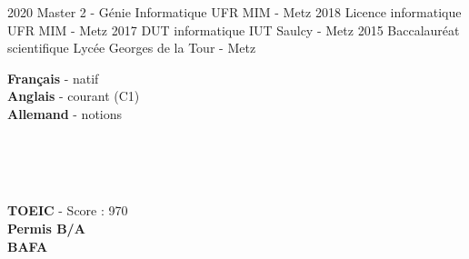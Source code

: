 \documentclass[9pt]{developercv} %
\begin{document}


\begin{entrylist}
	\entry
		{2020}
		{Master 2 - Génie Informatique}
		{UFR MIM - Metz}
		{}
	\entry
		{2018}
		{Licence informatique}
		{UFR MIM - Metz}
		{}
	\entry
		{2017}
		{DUT informatique}
		{IUT Saulcy - Metz}
		{}
	\entry
		{2015}
		{Baccalauréat scientifique}
		{Lycée Georges de la Tour - Metz}
		{}
\end{entrylist}


\begin{minipage}[t]{0.3\textwidth}
	\vspace{-\baselineskip} %

	
	\textbf{Français} - natif\\
	\textbf{Anglais} - courant (C1)\\
	\textbf{Allemand} - notions
\end{minipage}
\hfill
\begin{minipage}[t]{0.3\textwidth}
	\vspace{-\baselineskip} %
	
	
	\\
	\\
	\\
\end{minipage}
\hfill
\begin{minipage}[t]{0.3\textwidth}
	\vspace{-\baselineskip} %
	
	
	\textbf{TOEIC} - Score : 970\\
	\textbf{Permis B/A}\\
	\textbf{BAFA}
	
\end{minipage}

\end{document}
